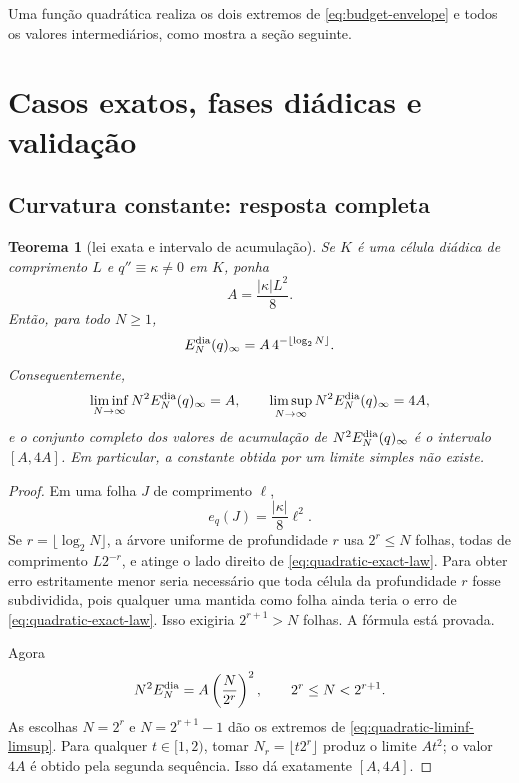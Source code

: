 \documentclass[11pt,a4paper]{article}
\newtheorem{theorem}{Teorema}[section]
\theoremstyle{definition}
\theoremstyle{remark}
\begin{document}
Uma função quadrática realiza os dois extremos de \eqref{eq:budget-envelope} e todos os valores intermediários, como mostra a seção seguinte.

\section{Casos exatos, fases diádicas e validação}
\label{sec:dyadic-exact-cases}

\subsection{Curvatura constante: resposta completa}

\begin{theorem}[lei exata e intervalo de acumulação]
\label{thm:quadratic-dyadic-constant}
Se $K$ é uma célula diádica de comprimento $L$ e
$q''\equiv\kappa\ne0$ em $K$, ponha
\begin{equation}
 A=\frac{|\kappa|L^2}{8}.
 \label{eq:quadratic-A}
\end{equation}
Então, para todo $N\ge1$,
\begin{equation}
 E_N^{\rm dia}(q)_\infty
 =A\,4^{-\lfloor\log_2N\rfloor}.
 \label{eq:quadratic-exact-law}
\end{equation}
Consequentemente,
\begin{equation}
 \liminf_{N\to\infty}N^2E_N^{\rm dia}(q)_\infty=A,
 \qquad
 \limsup_{N\to\infty}N^2E_N^{\rm dia}(q)_\infty=4A,
 \label{eq:quadratic-liminf-limsup}
\end{equation}
e o conjunto completo dos valores de acumulação de
$N^2E_N^{\rm dia}(q)_\infty$ é o intervalo $[A,4A]$. Em particular, a
constante obtida por um limite simples não existe.
\end{theorem}

\begin{proof}
Em uma folha $J$ de comprimento $\ell$,
\begin{equation}
 e_q(J)=\frac{|\kappa|}{8}\ell^2.
 \label{eq:quadratic-local-exact}
\end{equation}
Se $r=\lfloor\log_2N\rfloor$, a árvore uniforme de profundidade $r$ usa
$2^r\le N$ folhas, todas de comprimento $L2^{-r}$, e atinge o lado direito
de \eqref{eq:quadratic-exact-law}. Para obter erro estritamente menor seria
necessário que toda célula da profundidade $r$ fosse subdividida, pois
qualquer uma mantida como folha ainda teria o erro de
\eqref{eq:quadratic-exact-law}. Isso exigiria $2^{r+1}>N$ folhas. A fórmula
está provada.

Agora
\[
 N^2E_N^{\rm dia}=A\left(\frac{N}{2^r}\right)^2,
 \qquad 2^r\le N<2^{r+1}.
\]
As escolhas $N=2^r$ e $N=2^{r+1}-1$ dão os extremos de
\eqref{eq:quadratic-liminf-limsup}. Para qualquer $t\in[1,2)$, tomar
$N_r=\lfloor t2^r\rfloor$ produz o limite $At^2$; o valor $4A$ é obtido
pela segunda sequência. Isso dá exatamente $[A,4A]$.
\end{proof}
\end{document}
